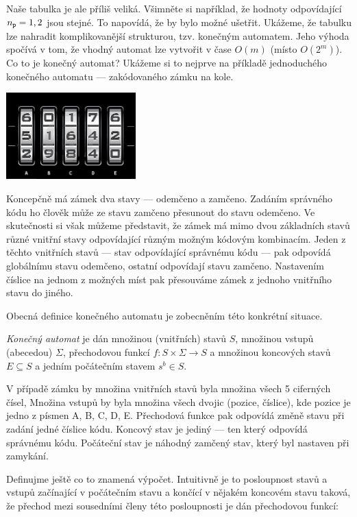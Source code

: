 Naše tabulka je ale příliš veliká. Všimněte si například, že hodnoty odpovídající
\(n_{\tt p} = 1,2\) jsou stejné.  To napovídá, že by bylo možné ušetřit. Ukážeme, 
že tabulku lze nahradit komplikovanější strukturou, tzv. konečným automatem. 
Jeho výhoda spočívá v tom, že vhodný automat  lze vytvořit v čase \(O(m)\) 
(místo \(O(2^{m})\)). Co to je konečný automat?  Ukážeme si to nejprve na příkladě
jednoduchého konečného automatu --- zakódovaného zámku na kole. 

\begin{center}
 \includegraphics[width=5cm]{combination-lock}
\end{center}

Koncepčně má zámek dva stavy --- odemčeno a zamčeno.  Zadáním správného kódu 
ho člověk může ze stavu zamčeno přesunout
do stavu odemčeno.  Ve skutečnosti si však můžeme představit, že zámek má mimo
dvou základních stavů různé vnitřní stavy odpovídající různým možným kódovým
kombinacím. Jeden z těchto vnitřních stavů --- stav odpovídající správnému kódu ---
pak odpovídá globálnímu stavu odemčeno, ostatní odpovídají stavu zamčeno. 
Nastavením číslice na jednom z možných míst pak přesouváme zámek z jednoho
vnitřního stavu do jiného.

Obecná definice konečného automatu je zobecněním této konkrétní situace.

\begin{definition} \emph{Konečný automat} je dán množinou (vnitřních) stavů \(S\),
množinou vstupů (abecedou) \(\Sigma\), přechodovou funkcí \(f:S\times\Sigma\to S\)
a množinou koncových stavů \(E\subseteq S\) a jedním počátečním stavem \(s^b\in S\).
\end{definition}

V případě zámku by množina vnitřních stavů byla množina všech 5 ciferných čísel,
Množina vstupů by byla množina všech dvojic (pozice, číslice), kde pozice je jedno z 
písmen A, B, C, D, E. Přechodová funkce pak odpovídá změně stavu při zadání jedné
číslice kódu. Koncový stav je jediný --- ten který odpovídá správnému kódu. 
Počáteční stav je náhodný zamčený stav, který byl nastaven při zamykání. 

Definujme ještě co to znamená výpočet. Intuitivně je to posloupnost stavů a vstupů
začínající v počátečním stavu a končící v nějakém koncovém stavu taková, že přechod 
mezi sousedními členy této posloupnosti je dán přechodovou funkcí:

